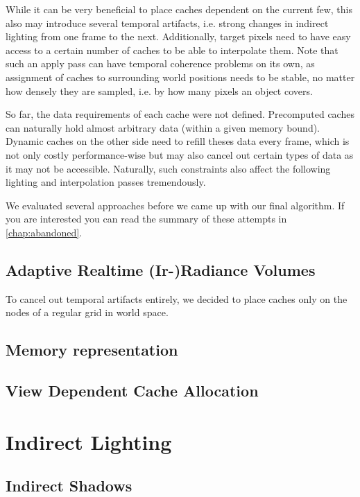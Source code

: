 \documentclass[thesis.tex]{subfiles}
\begin{document}
While it can be very beneficial to place caches dependent on the current few, this also may introduce several temporal artifacts, i.e. strong changes in indirect lighting from one frame to the next.
Additionally, target pixels need to have easy access to a certain number of caches to be able to interpolate them.
Note that such an apply pass can have temporal coherence problems on its own, as assignment of caches to surrounding world positions needs to be stable, no matter how densely they are sampled, i.e. by how many pixels an object covers.

So far, the data requirements of each cache were not defined.
Precomputed caches can naturally hold almost arbitrary data (within a given memory bound).
Dynamic caches on the other side need to refill theses data every frame, which is not only costly performance-wise but may also cancel out certain types of data as it may not be accessible. 
Naturally, such constraints also affect the following lighting and interpolation passes tremendously.

We evaluated several approaches before we came up with our final algorithm.
If you are interested you can read the summary of these attempts in \autoref{chap:abandoned}.

\subsection{Adaptive Realtime (Ir-)Radiance Volumes}
To cancel out temporal artifacts entirely, we decided to place caches only on the nodes of a regular grid in world space.



\subsection{Memory representation}

\subsection{View Dependent Cache Allocation}

\section{Indirect Lighting}


\subsection{Indirect Shadows}
\end{document}
